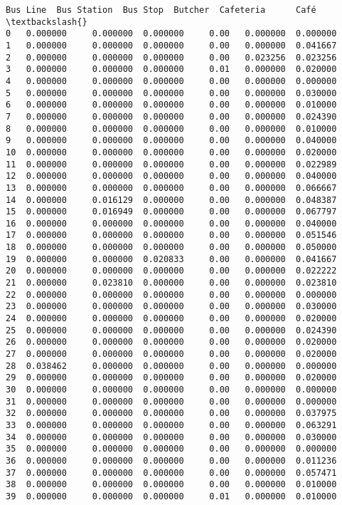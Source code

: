 \documentclass[11pt]{article}
\begin{document}
\begin{tcolorbox}[breakable, size=fbox, boxrule=.5pt, pad at break*=1mm, opacityfill=0]
\begin{Verbatim}[commandchars=\\\{\}]
    Bus Line  Bus Station  Bus Stop  Butcher  Cafeteria      Café  \textbackslash{}
0   0.000000     0.000000  0.000000     0.00   0.000000  0.000000
1   0.000000     0.000000  0.000000     0.00   0.000000  0.041667
2   0.000000     0.000000  0.000000     0.00   0.023256  0.023256
3   0.000000     0.000000  0.000000     0.01   0.000000  0.020000
4   0.000000     0.000000  0.000000     0.00   0.000000  0.000000
5   0.000000     0.000000  0.000000     0.00   0.000000  0.030000
6   0.000000     0.000000  0.000000     0.00   0.000000  0.010000
7   0.000000     0.000000  0.000000     0.00   0.000000  0.024390
8   0.000000     0.000000  0.000000     0.00   0.000000  0.010000
9   0.000000     0.000000  0.000000     0.00   0.000000  0.040000
10  0.000000     0.000000  0.000000     0.00   0.000000  0.020000
11  0.000000     0.000000  0.000000     0.00   0.000000  0.022989
12  0.000000     0.000000  0.000000     0.00   0.000000  0.040000
13  0.000000     0.000000  0.000000     0.00   0.000000  0.066667
14  0.000000     0.016129  0.000000     0.00   0.000000  0.048387
15  0.000000     0.016949  0.000000     0.00   0.000000  0.067797
16  0.000000     0.000000  0.000000     0.00   0.000000  0.040000
17  0.000000     0.000000  0.000000     0.00   0.000000  0.051546
18  0.000000     0.000000  0.000000     0.00   0.000000  0.050000
19  0.000000     0.000000  0.020833     0.00   0.000000  0.041667
20  0.000000     0.000000  0.000000     0.00   0.000000  0.022222
21  0.000000     0.023810  0.000000     0.00   0.000000  0.023810
22  0.000000     0.000000  0.000000     0.00   0.000000  0.000000
23  0.000000     0.000000  0.000000     0.00   0.000000  0.030000
24  0.000000     0.000000  0.000000     0.00   0.000000  0.020000
25  0.000000     0.000000  0.000000     0.00   0.000000  0.024390
26  0.000000     0.000000  0.000000     0.00   0.000000  0.020000
27  0.000000     0.000000  0.000000     0.00   0.000000  0.020000
28  0.038462     0.000000  0.000000     0.00   0.000000  0.000000
29  0.000000     0.000000  0.000000     0.00   0.000000  0.020000
30  0.000000     0.000000  0.000000     0.00   0.000000  0.000000
31  0.000000     0.000000  0.000000     0.00   0.000000  0.000000
32  0.000000     0.000000  0.000000     0.00   0.000000  0.037975
33  0.000000     0.000000  0.000000     0.00   0.000000  0.063291
34  0.000000     0.000000  0.000000     0.00   0.000000  0.030000
35  0.000000     0.000000  0.000000     0.00   0.000000  0.000000
36  0.000000     0.000000  0.000000     0.00   0.000000  0.011236
37  0.000000     0.000000  0.000000     0.00   0.000000  0.057471
38  0.000000     0.000000  0.000000     0.00   0.000000  0.010000
39  0.000000     0.000000  0.000000     0.01   0.000000  0.010000


\end{Verbatim}
\end{tcolorbox}
\end{document}
